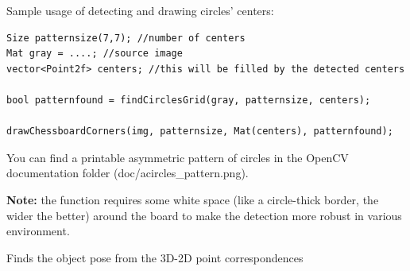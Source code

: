 Sample usage of detecting and drawing circles' centers:
\begin{lstlisting}
Size patternsize(7,7); //number of centers
Mat gray = ....; //source image
vector<Point2f> centers; //this will be filled by the detected centers

bool patternfound = findCirclesGrid(gray, patternsize, centers);

drawChessboardCorners(img, patternsize, Mat(centers), patternfound);
\end{lstlisting}

You can find a printable asymmetric pattern of circles in the OpenCV
documentation folder (doc/acircles\_pattern.png).

\textbf{Note:} the function requires some white space (like a circle-thick
border, the wider the better) around the board to make the detection more robust in various environment.
\fi

\ifCPy
{}
\else
{}
\fi
Finds the object pose from the 3D-2D point correspondences

